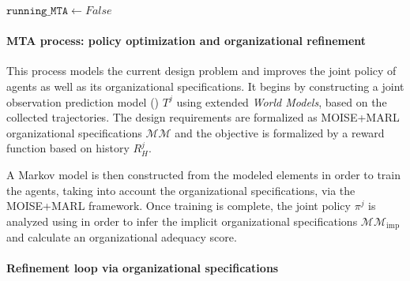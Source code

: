 \begin{algorithm}[h!]
{  

  $\texttt{running\_MTA} \gets False$ 

  }
\end{algorithm}

\paragraph{MTA process: policy optimization and organizational refinement}

This process models the current design problem and improves the joint policy of agents as well as its organizational specifications. It begins by constructing a joint observation prediction model () $T^j$ using extended \textit{World Models}, based on the collected trajectories. The design requirements are formalized as MOISE+MARL organizational specifications $\mathcal{MM}$ and the objective is formalized by a reward function based on history $R^j_H$.

A Markov model is then constructed from the modeled elements in order to train the agents, taking into account the organizational specifications, via the MOISE+MARL framework. Once training is complete, the joint policy $\pi^j$ is analyzed using  in order to infer the implicit organizational specifications $\mathcal{MM}_{\text{imp}}$ and calculate an organizational adequacy score.

\paragraph{Refinement loop via organizational specifications}


